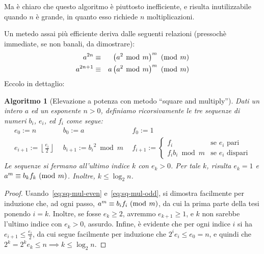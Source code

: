 \documentclass[pdflatex,11pt,a4paper,oneside]{article}
\newcommand{\p}[1]{\left({#1}\right)}
\newcommand{\floor}[1]{\left\lfloor{#1}\right\rfloor}
\newcommand{\congruent}[0]{\equiv}
\newcommand{\mmodop}[0]{\ensuremath{\operatorname{mod}}}
\newcommand{\mmod}[1]{\ensuremath{\allowbreak\ (\mmodop\:{#1})}}
\newcommand{\rem}[2]{\ensuremath{{#1}\:\mmodop\:{#2}}}
\newtheorem{algorithm}[TheoremLike]{Algoritmo}
\begin{document}
Ma \`e chiaro che questo algoritmo \`e piuttosto inefficiente, e risulta
inutilizzabile quando $n$ \`e grande, in quanto esso richiede $n$
moltiplicazioni.

Un metedo assai pi\`u efficiente deriva dalle seguenti relazioni
(pressoch\`e immediate, se non banali, da dimostrare):
\begin{eqnarray}
  a^{2n}   & \congruent & \p{\rem{a^2}{m}}^m \mmod m
    \label{eq:sq-mul-even}
  \\
  a^{2n+1} & \congruent & a \p{\rem{a^2}{m}}^m \mmod m
    \label{eq:sq-mul-odd}
\end{eqnarray}
%
Eccolo in dettaglio:
\begin{algorithm}[Elevazione a potenza con metodo ``square and multiply'']
Dati un intero $a$ ed un esponente $n > 0$, definiamo ricorsivamente le
tre sequenze di numeri $b_i$, $e_i$, ed $f_i$ come segue:
\begin{displaymath}
  \begin{array}{lll}
    e_0 := n &
    b_0 := a &
    f_0 := 1
  \\
    e_{i+1} := \floor{\frac{e_i}{2}} ~~ &
    b_{i+1} := \rem{{b_i}^2}{m} ~~ &
    f_{i+1} := \begin{cases}
             f_i & \text{se $e_i$ pari} \\
             \rem{f_i b_i}{m} & \text{se $e_i$ dispari}
           \end{cases}
  \end{array}
\end{displaymath}
Le sequenze si fermano all'ultimo indice $k$ con $e_k > 0$.  Per tale
$k$, risulta $e_k = 1$ e $a^m \congruent b_k f_k \mmod m$.  Inoltre,
$k \leq \log_2 n$.
\end{algorithm}

\begin{proof}
Usando~\eqref{eq:sq-mul-even} e~\eqref{eq:sq-mul-odd}, si dimostra
facilmente per induzione che, ad ogni passo, $a^m \congruent b_i f_i
\mmod m$, da cui la prima parte della tesi ponendo $i = k$.  Inoltre,
se fosse $e_k \geq 2$, avremmo $e_{k+1} \geq 1$, e $k$ non sarebbe
l'ultimo indice con $e_k > 0$, assurdo.  Infine, \`e evidente che
per ogni indice $i$ si ha $e_{i+1} \leq \frac{e_i}{2}$, da cui segue
facilmente per induzione che $2^i e_i \leq e_0 = n$, e quindi che
$2^k = 2^k e_k \leq n \implies k \leq \log_2 n$.
\end{proof}

\end{document}
